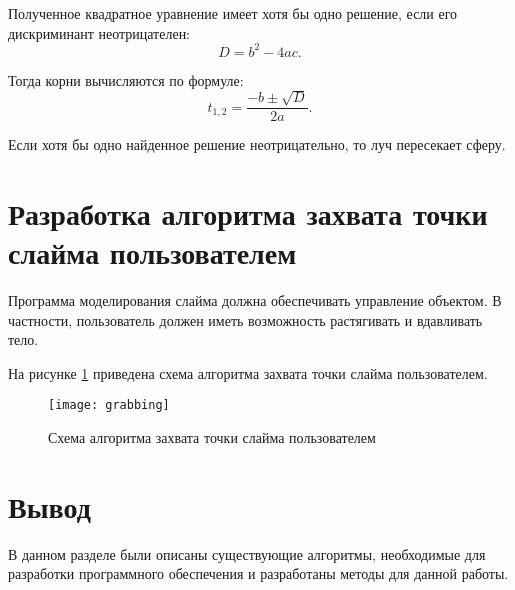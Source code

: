 Полученное квадратное уравнение имеет хотя бы одно решение, если его дискриминант неотрицателен:
\begin{equation}\label{sphd}
	D = b^2 - 4ac.
\end{equation}

Тогда корни вычисляются по формуле:
\begin{equation}
	t_{1,2} = \frac{-b \pm \sqrt{D}}{2a}.
\end{equation}

Если хотя бы одно найденное решение неотрицательно, то луч пересекает сферу.

\section[Разработка алгоритма захвата точки слайма пользователем]{Разработка алгоритма захвата точки\\слайма пользователем}

Программа моделирования слайма должна обеспечивать управление объектом. В частности, пользователь должен иметь возможность растягивать и вдавливать тело.

На рисунке \ref{grabbing} приведена схема алгоритма захвата точки слайма пользователем.

\begin{figure}[H]
	\centering
	\texttt{[image: grabbing]}
	\caption{Схема алгоритма захвата точки слайма пользователем}
	\label{grabbing}
\end{figure}

\section*{Вывод}
В данном разделе были описаны существующие алгоритмы, необходимые для разработки программного обеспечения и разработаны методы для данной работы.

\clearpage
